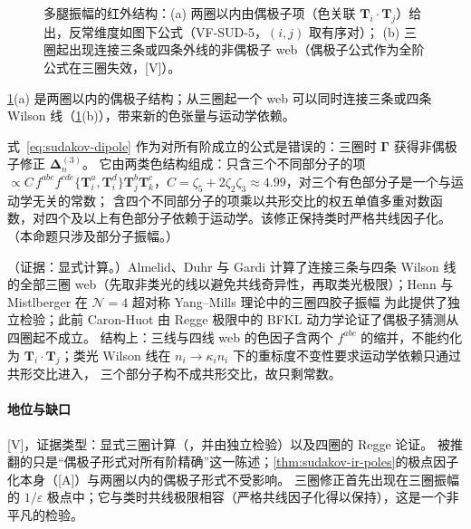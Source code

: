 \begin{figure}[htbp]
\caption{多腿振幅的红外结构：(a) 两圈以内由偶极子项（色关联 $\mathbf T_i\cdot\mathbf T_j$）给出，反常维度如图下公式（VF-SUD-5，$(i,j)$ 取有序对）；
(b) 三圈起出现连接三条或四条外线的非偶极子 web（偶极子公式作为全阶公式在三圈失效，[V]）。}
\label{fig:sudakov-dipole}
\end{figure}

\cref{fig:sudakov-dipole}(a) 是两圈以内的偶极子结构；从三圈起一个 web 可以同时连接三条或四条 Wilson 线（\cref{fig:sudakov-dipole}(b)），带来新的色张量与运动学依赖。

\begin{proposition}\label{prop:sudakov-dipole-violation}
式~\eqref{eq:sudakov-dipole} 作为对所有阶成立的公式是错误的：三圈时 $\boldsymbol\Gamma$ 获得非偶极子修正 $\boldsymbol\Delta^{(3)}_n$。
它由两类色结构组成：只含三个不同部分子的项 $\propto C\,f^{abe}f^{cde}\{\mathbf T_i^a,\mathbf T_i^d\}\mathbf T_j^b\mathbf T_k^c$，$C=\zeta_5+2\zeta_2\zeta_3\approx4.99$，对三个有色部分子是一个与运动学无关的常数；
含四个不同部分子的项乘以共形交比的权五单值多重对数函数，对四个及以上有色部分子依赖于运动学。该修正保持类时严格共线因子化\cite[式~(7)、(13)、(14)、(17)]{Almelid:2015jia}。
（本命题只涉及部分子振幅。）
\end{proposition}

\begin{proofsketch}
（证据：显式计算。）Almelid、Duhr 与 Gardi 计算了连接三条与四条 Wilson 线的全部三圈 web（先取非类光的线以避免共线奇异性，再取类光极限）\cite{Almelid:2015jia}；Henn 与 Mistlberger 在 $\mathcal N=4$ 超对称 Yang--Mills 理论中的三圈四胶子振幅
为此提供了独立检验\cite{Henn:2016jdu}；此前 Caron-Huot 由 Regge 极限中的 BFKL 动力学论证了偶极子猜测从四圈起不成立\cite[第~4.3~节，式~(4.28)]{Caron-Huot:2013fea}。
结构上：三线与四线 web 的色因子含两个 $f^{abc}$ 的缩并，不能约化为 $\mathbf T_i\cdot\mathbf T_j$；类光 Wilson 线在 $n_i\to\kappa_in_i$ 下的重标度不变性要求运动学依赖只通过共形交比进入，
三个部分子构不成共形交比，故只剩常数。
\end{proofsketch}

\paragraph{地位与缺口}[V]，证据类型：显式三圈计算（\cite{Almelid:2015jia}，并由\cite{Henn:2016jdu}独立检验）以及四圈的 Regge 论证\cite{Caron-Huot:2013fea}。
被推翻的只是“偶极子形式对所有阶精确”这一陈述；\cref{thm:sudakov-ir-poles}的极点因子化本身（[A]）与两圈以内的偶极子形式不受影响。
三圈修正首先出现在三圈振幅的 $1/\varepsilon$ 极点中；它与类时共线极限相容（严格共线因子化得以保持），这是一个非平凡的检验。
